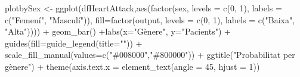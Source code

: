 \documentclass[
]{article}
\newenvironment{Shaded}{\begin{snugshade}}{\end{snugshade}}
\newcommand{\AttributeTok}[1]{\textcolor[rgb]{0.80,0.80,0.80}{#1}}
\newcommand{\DecValTok}[1]{\textcolor[rgb]{0.86,0.86,0.80}{#1}}
\newcommand{\FunctionTok}[1]{\textcolor[rgb]{0.94,0.94,0.56}{#1}}
\newcommand{\NormalTok}[1]{\textcolor[rgb]{0.80,0.80,0.80}{#1}}
\newcommand{\OtherTok}[1]{\textcolor[rgb]{0.94,0.94,0.56}{#1}}
\newcommand{\SpecialCharTok}[1]{\textcolor[rgb]{0.86,0.64,0.64}{#1}}
\newcommand{\StringTok}[1]{\textcolor[rgb]{0.80,0.58,0.58}{#1}}
\begin{document}
\begin{Shaded}
\begin{Highlighting}[]
\NormalTok{plotbySex }\OtherTok{\textless{}{-}} \FunctionTok{ggplot}\NormalTok{(dfHeartAttack,}\FunctionTok{aes}\NormalTok{(}\FunctionTok{factor}\NormalTok{(sex, }\AttributeTok{levels =} \FunctionTok{c}\NormalTok{(}\DecValTok{0}\NormalTok{, }\DecValTok{1}\NormalTok{), }\AttributeTok{labels =} \FunctionTok{c}\NormalTok{(}\StringTok{"Femení"}\NormalTok{, }\StringTok{"Masculí"}\NormalTok{)), }\AttributeTok{fill=}\FunctionTok{factor}\NormalTok{(output, }\AttributeTok{levels =} \FunctionTok{c}\NormalTok{(}\DecValTok{0}\NormalTok{, }\DecValTok{1}\NormalTok{), }\AttributeTok{labels =} \FunctionTok{c}\NormalTok{(}\StringTok{"Baixa"}\NormalTok{, }\StringTok{"Alta"}\NormalTok{)))) }\SpecialCharTok{+} 
                    \FunctionTok{geom\_bar}\NormalTok{() }\SpecialCharTok{+}\FunctionTok{labs}\NormalTok{(}\AttributeTok{x=}\StringTok{"Gènere"}\NormalTok{, }\AttributeTok{y=}\StringTok{"Pacients"}\NormalTok{) }\SpecialCharTok{+} 
                    \FunctionTok{guides}\NormalTok{(}\AttributeTok{fill=}\FunctionTok{guide\_legend}\NormalTok{(}\AttributeTok{title=}\StringTok{""}\NormalTok{)) }\SpecialCharTok{+} 
                  \FunctionTok{scale\_fill\_manual}\NormalTok{(}\AttributeTok{values=}\FunctionTok{c}\NormalTok{(}\StringTok{"\#008000"}\NormalTok{,}\StringTok{"\#800000"}\NormalTok{)) }\SpecialCharTok{+} 
                    \FunctionTok{ggtitle}\NormalTok{(}\StringTok{"Probabilitat per gènere"}\NormalTok{) }\SpecialCharTok{+}
          \FunctionTok{theme}\NormalTok{(}\AttributeTok{axis.text.x =} \FunctionTok{element\_text}\NormalTok{(}\AttributeTok{angle =} \DecValTok{45}\NormalTok{, }\AttributeTok{hjust =} \DecValTok{1}\NormalTok{))}


\end{Highlighting}
\end{Shaded}
\end{document}

